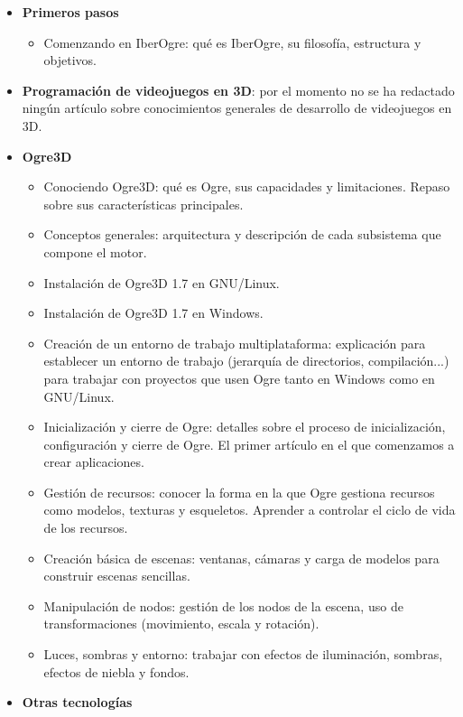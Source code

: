 \documentclass[16pt,spanish]{article}
\begin{document}
\begin{itemize}
    \item \textbf{Primeros pasos}
    \begin{itemize}
        \item Comenzando en IberOgre: qué es IberOgre, su filosofía,
        estructura y objetivos.
    \end{itemize}
    \item \textbf{Programación de videojuegos en 3D}: por el momento no
    se ha redactado ningún artículo sobre conocimientos generales de desarrollo
    de videojuegos en 3D.
    \item \textbf{Ogre3D}
    \begin{itemize}
        \item Conociendo Ogre3D: qué es Ogre, sus capacidades y limitaciones.
        Repaso sobre sus características principales.
        \item Conceptos generales: arquitectura y descripción de cada 
        subsistema que compone el motor.
        \item Instalación de Ogre3D 1.7 en GNU/Linux.
        \item Instalación de Ogre3D 1.7 en Windows.
        \item Creación de un entorno de trabajo multiplataforma: explicación
        para establecer un entorno de trabajo (jerarquía de directorios,
        compilación...) para trabajar con proyectos que usen Ogre tanto
        en Windows como en GNU/Linux.
        \item Inicialización y cierre de Ogre: detalles sobre el proceso de
        inicialización, configuración y cierre de Ogre. El primer artículo
        en el que comenzamos a crear aplicaciones.
        \item Gestión de recursos: conocer la forma en la que Ogre gestiona
        recursos como modelos, texturas y esqueletos. Aprender a controlar
        el ciclo de vida de los recursos.
        \item Creación básica de escenas: ventanas, cámaras y carga de modelos
        para construir escenas sencillas.
        \item Manipulación de nodos: gestión de los nodos de la escena, uso
        de transformaciones (movimiento, escala y rotación).
        \item Luces, sombras y entorno: trabajar con efectos de iluminación,
        sombras, efectos de niebla y fondos.
    \end{itemize}
    \item \textbf{Otras tecnologías}

\end{itemize}
\end{document}
